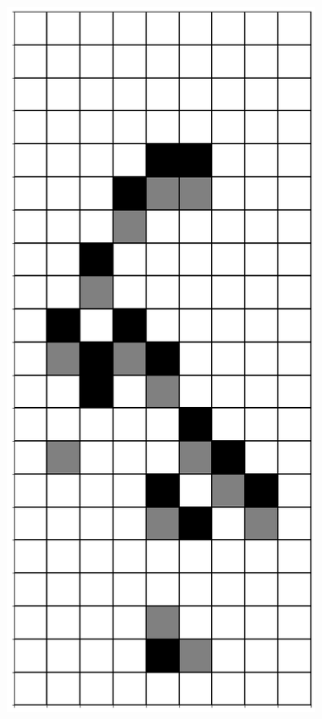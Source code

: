 \documentclass[12pt]{article}
\numberwithin{figure}{section} %
\begin{document}
\begin{figure}[H]
\begin{subfigure}{0.19\textwidth}
     		\subcaption{}
   	\end{subfigure}
     	\begin{subfigure}{0.19\textwidth}
     		\centering
     		\includegraphics[width=\linewidth]{Section4/25.1}

\end{subfigure}
\end{figure}
\end{document}
